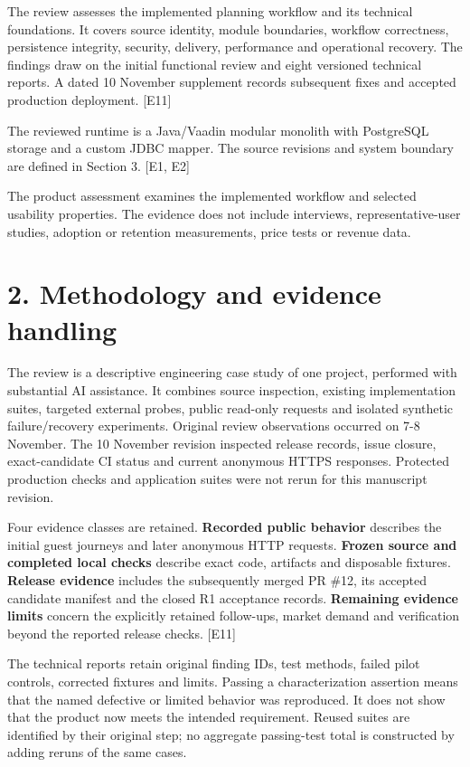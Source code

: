 \documentclass[11pt,a4paper]{article}
\begin{document}
The review assesses the implemented planning workflow and its technical foundations. It covers source identity, module boundaries, workflow correctness, persistence integrity, security, delivery, performance and operational recovery. The findings draw on the initial functional review and eight versioned technical reports. A dated 10 November supplement records subsequent fixes and accepted production deployment. [E11]

The reviewed runtime is a Java/\allowbreak{}Vaadin modular monolith with PostgreSQL storage and a custom JDBC mapper. The source revisions and system boundary are defined in Section 3. [E1, E2]

The product assessment examines the implemented workflow and selected usability properties. The evidence does not include interviews, representative-user studies, adoption or retention measurements, price tests or revenue data.

\section*{2. Methodology and evidence handling}

The review is a descriptive engineering case study of one project, performed with substantial AI assistance. It combines source inspection, existing implementation suites, targeted external probes, public read-only requests and isolated synthetic failure/\allowbreak{}recovery experiments. Original review observations occurred on 7-8 November. The 10 November revision inspected release records, issue closure, exact-candidate CI status and current anonymous HTTPS responses. Protected production checks and application suites were not rerun for this manuscript revision.

Four evidence classes are retained. \textbf{Recorded public behavior} describes the initial guest journeys and later anonymous HTTP requests. \textbf{Frozen source and completed local checks} describe exact code, artifacts and disposable fixtures. \textbf{Release evidence} includes the subsequently merged PR \#12, its accepted candidate manifest and the closed R1 acceptance records. \textbf{Remaining evidence limits} concern the explicitly retained follow-ups, market demand and verification beyond the reported release checks. [E11]

The technical reports retain original finding IDs, test methods, failed pilot controls, corrected fixtures and limits. Passing a characterization assertion means that the named defective or limited behavior was reproduced. It does not show that the product now meets the intended requirement. Reused suites are identified by their original step; no aggregate passing-test total is constructed by adding reruns of the same cases.
\end{document}
